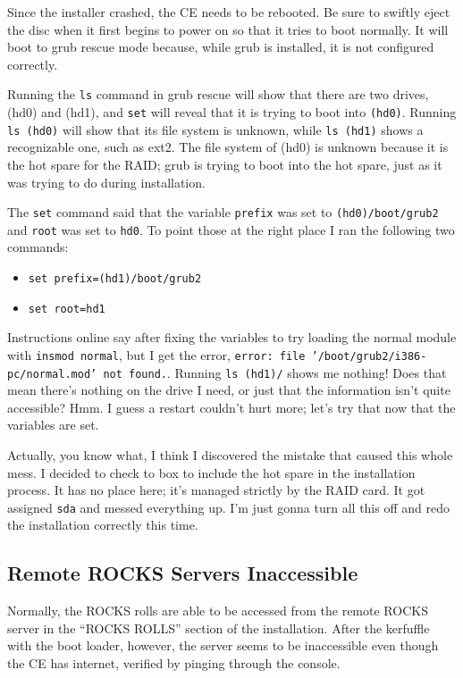 \documentclass[12pt]{article}
\begin{document}
\qq Since the installer crashed, the CE needs to be rebooted. Be sure to swiftly
eject the disc when it first begins to power on so that it tries to boot
normally. It will boot to grub rescue mode because, while grub is installed, it
is not configured correctly.

\qq Running the {\tt ls} command in grub rescue will show that there are two
drives, (hd0) and (hd1), and {\tt set} will reveal that it is trying to boot into
{\tt (hd0)}. Running {\tt ls (hd0)} will show that its file system is unknown,
while {\tt ls (hd1)} shows a recognizable one, such as ext2. The file system of
(hd0) is unknown because it is the hot spare for the RAID; grub is trying to
boot into the hot spare, just as it was trying to do during installation.

\qq The {\tt set} command said that the variable {\tt prefix} was set to
{\tt (hd0)/boot/grub2} and {\tt root} was set to {\tt hd0}. To point those at the
right place I ran the following two commands:

\begin{itemize}
  \item {\tt set prefix=(hd1)/boot/grub2}
  \item {\tt set root=hd1}
\end{itemize}

\qq Instructions online say after fixing the variables to try loading the normal
module with {\tt insmod normal}, but I get the error, {\tt error: file
  '/boot/grub2/i386-pc/normal.mod' not found.}. Running {\tt ls (hd1)/} shows me
nothing! Does that mean there's nothing on the drive I need, or just that the
information isn't quite accessible? Hmm. I guess a restart couldn't hurt more;
let's try that now that the variables are set.

\qq Actually, you know what, I think I discovered the mistake that caused this
whole mess. I decided to check to box to include the hot spare in the
installation process. It has no place here; it's managed strictly by the RAID
card. It got assigned {\tt sda} and messed everything up. I'm just gonna turn all
this off and redo the installation correctly this time.

\subsection{Remote ROCKS Servers Inaccessible}

\qq Normally, the ROCKS rolls are able to be accessed from the remote ROCKS
server in the ``ROCKS ROLLS'' section of the installation. After the kerfuffle
with the boot loader, however, the server seems to be inaccessible even though
the CE has internet, verified by pinging through the console.
\end{document}
